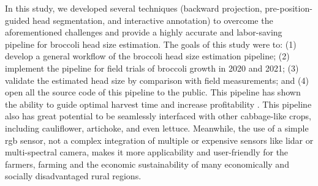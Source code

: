 

In this study, we developed several techniques (backward projection, pre-position-guided head segmentation, and interactive annotation) to overcome the aforementioned challenges and provide a highly accurate and labor-saving pipeline for broccoli head size estimation. The goals of this study were to: (1) develop a general workflow of the broccoli head size estimation pipeline; (2) implement the pipeline for field trials of broccoli growth in 2020 and 2021; (3) validate the estimated head size by comparison with field measurements; and (4) open all the source code of this pipeline to the public. This pipeline has shown the ability to guide optimal harvest time and increase profitability \cite{nishida_estimation_2023}. This pipeline also has great potential to be seamlessly interfaced with other cabbage-like crops, including cauliflower, artichoke, and even lettuce. Meanwhile, the use of a simple \gls{rgb} sensor, not a complex integration of multiple or expensive sensors like \gls{lidar} or multi-spectral camera, makes it more applicability and user-friendly for the farmers, farming and the economic sustainability of many economically and socially disadvantaged rural regions. 


